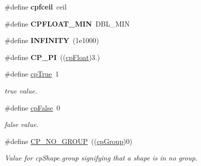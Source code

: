 \begin{DoxyCompactItemize}
\#define {\bfseries cpfceil}~ceil
\item 
\mbox{\label{group__basic_types_ga9885777f2bb284bc9148d0b8031e620e}} 
\#define {\bfseries C\+P\+F\+L\+O\+A\+T\+\_\+\+M\+IN}~D\+B\+L\+\_\+\+M\+IN
\item 
\mbox{\label{group__basic_types_ga956e2723d559858d08644ac99146e910}} 
\#define {\bfseries I\+N\+F\+I\+N\+I\+TY}~(1e1000)
\item 
\mbox{\label{group__basic_types_ga45b75a58ad00a44f105ce2703dde3716}} 
\#define {\bfseries C\+P\+\_\+\+PI}~((\mbox{\hyperlink{group__basic_types_gac1ed65573e035bf892505768c852d8d3}{cp\+Float}})3.)
\item 
\mbox{\label{group__basic_types_gae30fc24a6e711797b9d39efa0e999987}} 
\#define \mbox{\hyperlink{group__basic_types_gae30fc24a6e711797b9d39efa0e999987}{cp\+True}}~1
\begin{DoxyCompactList}\small\item\em true value. \end{DoxyCompactList}\item 
\mbox{\label{group__basic_types_ga4b0cfe38ff97abec3400f9bb7e18f21e}} 
\#define \mbox{\hyperlink{group__basic_types_ga4b0cfe38ff97abec3400f9bb7e18f21e}{cp\+False}}~0
\begin{DoxyCompactList}\small\item\em false value. \end{DoxyCompactList}\item 
\mbox{\label{group__basic_types_gabd2870d269e0288b26b045c81a07acc8}} 
\#define \mbox{\hyperlink{group__basic_types_gabd2870d269e0288b26b045c81a07acc8}{C\+P\+\_\+\+N\+O\+\_\+\+G\+R\+O\+UP}}~((\mbox{\hyperlink{group__basic_types_gacd811b1135a8f4a3e5cc019552b18b1a}{cp\+Group}})0)
\begin{DoxyCompactList}\small\item\em Value for cp\+Shape.\+group signifying that a shape is in no group. \end{DoxyCompactList}\item 
\mbox{\label{group__basic_types_ga591693fbd3ed24f3365ef7accf349d4f}} 

\end{DoxyCompactItemize}
